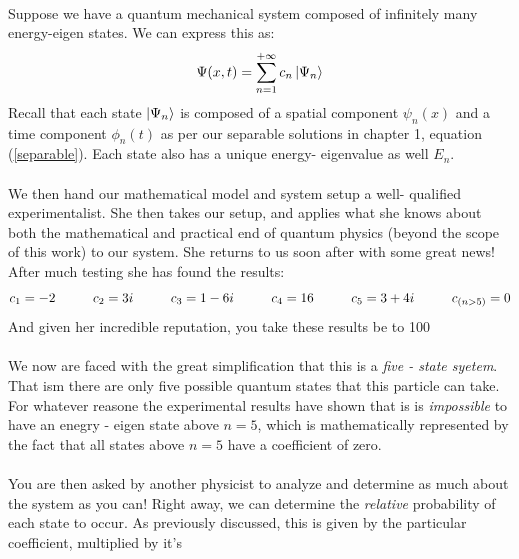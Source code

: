 \documentclass[12pt,letterpaper]{book}
\begin{document}
\paragraph*{}Suppose we have a quantum mechanical system composed of infinitely many energy-eigen states. We can express this as:
\begin{equation}
\Psi(x,t) = \sum_{n=1}^{+\infty} c_n \ket{\Psi_n}
\end{equation}
Recall that each state $\ket{\Psi_n}$ is composed of a spatial component $\psi_n(x)$ and a time component $\phi_n(t)$ as per our separable solutions in chapter 1, equation (\ref{separable}). Each state also has a unique energy- eigenvalue as well $E_n$.
\paragraph*{}We then hand our mathematical model and system setup a well- qualified experimentalist. She then takes our setup, and applies what she knows about both the mathematical and practical end of quantum physics (beyond the scope of this work) to our system. She returns to us soon after with some great news! After much testing she has found the results:
\begin{equation}
c_1 = -2 \hspace*{1cm}
c_2 = 3i \hspace*{1cm}
c_3 = 1 - 6i \hspace{1cm}
c_4 = 16 \hspace*{1cm}
c_5 = 3 + 4i \hspace{1cm}
c_{(n > 5)} = 0
\end{equation}
And given her incredible reputation, you take these results be to 100%
\paragraph*{}We now are faced with the great simplification that this is a \textit{five - state syetem}. That ism there are only five possible quantum states that this particle can take. For whatever reasone the experimental results have shown that is is \textit{impossible} to have an enegry - eigen state above $n = 5$, which is mathematically represented by the fact that all states above $n = 5$ have a coefficient of zero.
\paragraph*{}You are then asked by another physicist to analyze and determine as much about the system as you can! Right away, we can determine the \textit{relative} probability of each state to occur. As previously discussed, this is given by the particular coefficient, multiplied by it's 
\end{document}
